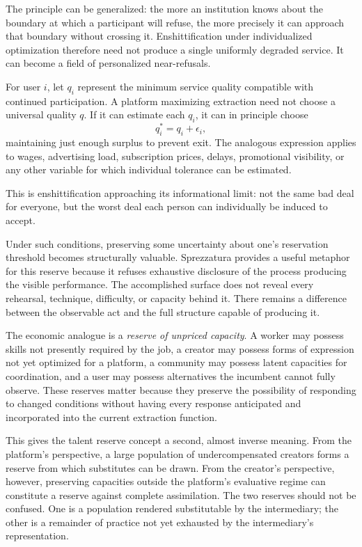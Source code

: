 \documentclass[11pt]{article}
\begin{document}
The principle can be generalized: the more an institution knows about the boundary at which a participant will refuse, the more precisely it can approach that boundary without crossing it. Enshittification under individualized optimization therefore need not produce a single uniformly degraded service. It can become a field of personalized near-refusals.

For user \(i\), let \(q_i\) represent the minimum service quality compatible with continued participation. A platform maximizing extraction need not choose a universal quality \(q\). If it can estimate each \(q_i\), it can in principle choose
\[
q_i^{*}=q_i+\epsilon_i,
\]
maintaining just enough surplus to prevent exit. The analogous expression applies to wages, advertising load, subscription prices, delays, promotional visibility, or any other variable for which individual tolerance can be estimated.

This is enshittification approaching its informational limit: not the same bad deal for everyone, but the worst deal each person can individually be induced to accept.

Under such conditions, preserving some uncertainty about one's reservation threshold becomes structurally valuable. Sprezzatura provides a useful metaphor for this reserve because it refuses exhaustive disclosure of the process producing the visible performance. The accomplished surface does not reveal every rehearsal, technique, difficulty, or capacity behind it. There remains a difference between the observable act and the full structure capable of producing it.

The economic analogue is a \emph{reserve of unpriced capacity}. A worker may possess skills not presently required by the job, a creator may possess forms of expression not yet optimized for a platform, a community may possess latent capacities for coordination, and a user may possess alternatives the incumbent cannot fully observe. These reserves matter because they preserve the possibility of responding to changed conditions without having every response anticipated and incorporated into the current extraction function.

This gives the talent reserve concept a second, almost inverse meaning. From the platform's perspective, a large population of undercompensated creators forms a reserve from which substitutes can be drawn. From the creator's perspective, however, preserving capacities outside the platform's evaluative regime can constitute a reserve against complete assimilation. The two reserves should not be confused. One is a population rendered substitutable by the intermediary; the other is a remainder of practice not yet exhausted by the intermediary's representation.
\end{document}
